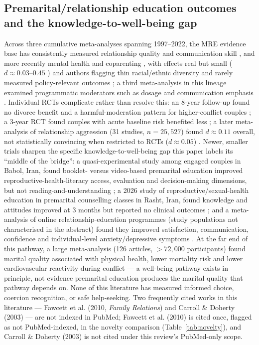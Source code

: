 \subsection{Premarital/relationship education outcomes and the knowledge-to-well-being gap}
Across three cumulative meta-analyses spanning 1997--2022, the MRE evidence base has consistently measured relationship quality and communication skill \cite{ref6,ref33}, and more recently mental health and coparenting \cite{ref7}, with effects real but small ($d\approx 0.03$--$0.45$ \cite{ref6,ref7}) and authors flagging thin racial/ethnic diversity \cite{ref6} and rarely measured policy-relevant outcomes \cite{ref7}; a third meta-analysis in this lineage examined programmatic moderators such as dosage and communication emphasis \cite{ref33}. Individual RCTs complicate rather than resolve this: an 8-year follow-up found no divorce benefit and a harmful-moderation pattern for higher-conflict couples \cite{ref9}; a 3-year RCT found couples with acute baseline risk benefited less \cite{ref10}; a later meta-analysis of relationship aggression (31 studies, $n=25{,}527$) found $d\approx 0.11$ overall, not statistically convincing when restricted to RCTs ($d\approx 0.05$) \cite{ref8}. Newer, smaller trials sharpen the specific knowledge-to-well-being gap this paper labels its ``middle of the bridge'': a quasi-experimental study among engaged couples in Babol, Iran, found booklet- versus video-based premarital education improved reproductive-health-literacy access, evaluation and decision-making dimensions, but not reading-and-understanding \cite{ref34}; a 2026 study of reproductive/sexual-health education in premarital counselling classes in Rasht, Iran, found knowledge and attitudes improved at 3 months but reported no clinical outcomes \cite{ref35}; and a meta-analysis of online relationship-education programmes (study populations not characterised in the abstract) found they improved satisfaction, communication, confidence and individual-level anxiety/depressive symptoms \cite{ref36}. At the far end of this pathway, a large meta-analysis (126 articles, $>72{,}000$ participants) found marital quality associated with physical health, lower mortality risk and lower cardiovascular reactivity during conflict \cite{ref37} --- a well-being pathway exists in principle, not evidence premarital education produces the marital quality that pathway depends on. None of this literature has measured informed choice, coercion recognition, or safe help-seeking. Two frequently cited works in this literature --- Fawcett et al. (2010, \emph{Family Relations}) and Carroll \& Doherty (2003) --- are not indexed in PubMed; Fawcett et al. (2010) is cited once, flagged as not PubMed-indexed, in the novelty comparison (Table~\ref{tab:novelty}), and Carroll \& Doherty (2003) is not cited under this review's PubMed-only scope.

